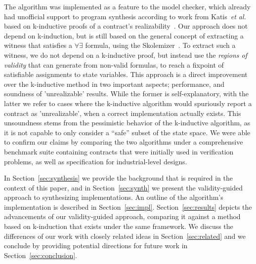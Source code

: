 The algorithm was implemented as a feature to the \jkind model checker, which
already had unofficial support to program synthesis according to work from
Katis~\textit{et al.} based on k-inductive proofs of a contract's
realizability~\cite{gacek2015towards,katis2016towards,katis2016synthesis}.
Our approach does not depend on k-induction, but is still based on the general
concept of extracting a witness that satisfies a $\forall\exists$ formula, using
the \aeval Skolemizer~\cite{fedyukovich2015automated}. To extract such a witness, we do not depend on a k-inductive proof, but instead use the \textit{regions of validity} that \aeval can generate from non-valid formulas,
to reach a fixpoint of satisfiable assignments to state variables.
This approach is a direct improvement over the k-inductive method in two
important aspects; performance, and soundness of 'unrealizable' results. While
the former is self-explanatory, with the latter we refer to cases where the
k-inductive algorithm would spuriously report a contract as 'unrealizable', when a correct
implementation actually exists. This unsoundness stems from the pessimistic
behavior of the k-inductive algorithm, as it is not capable to only consider a
``safe'' subset of the state space. We were able to confirm our claims
by comparing the two algorithms under a comprehensive benchmark suite containing
contracts that were initially used in verification problems, as well as
specification for industrial-level designs.

In Section~\ref{sec:synthesis} we provide the background that is required in the
context of this paper, and in Section~\ref{sec:synth} we present the validity-guided approach to synthesizing
implementations. 
An outline of the algorithm's implementation is described
in Section~\ref{sec:impl}. Section~\ref{sec:results} depicts the advancements of our validity-guided
approach, comparing it against a method based on k-induction that exists under the same framework.
We discuss the differences of our work with closely related ideas in
Section~\ref{sec:related} and we conclude by providing potential directions for future work in Section~\ref{sec:conclusion}.

